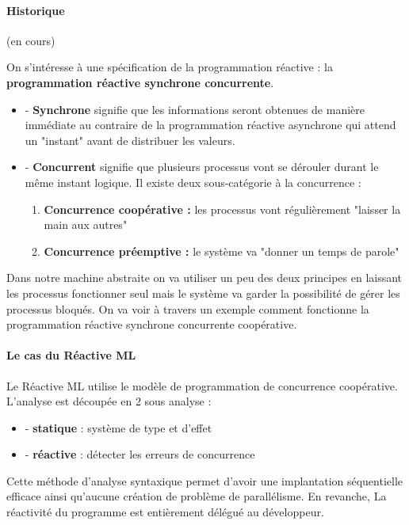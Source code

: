 \documentclass[10pt,a4paper]{report}
\begin{document}
\paragraph{Historique} (en cours)
\medbreak

On s'intéresse à une spécification de la programmation réactive : la \textbf{programmation réactive synchrone concurrente}.
\begin{itemize}
\item[] - \textbf{Synchrone} signifie que les informations seront obtenues de manière immédiate au contraire de la programmation réactive asynchrone qui attend un "instant" avant de distribuer les valeurs. 
\item[] - \textbf{Concurrent} signifie que plusieurs processus vont se dérouler durant le même instant logique. Il existe deux sous-catégorie à la concurrence :
  \begin{enumerate}
  \item \textbf{Concurrence coopérative :} les processus vont régulièrement "laisser la main aux autres"
  \item \textbf{Concurrence préemptive :} le système va "donner un temps de parole"
  \end{enumerate}
\end{itemize}
\smallbreak
Dans notre machine abstraite on va utiliser un peu des deux principes en laissant les processus fonctionner seul mais le système va garder la possibilité de gérer les processus bloqués. On va voir à travers un exemple comment fonctionne la programmation réactive synchrone concurrente coopérative.

\paragraph{Le cas du Réactive ML}
Le Réactive ML utilise le modèle de programmation de concurrence coopérative. 
\smallbreak
L'analyse est découpée en 2 sous analyse :
\begin{itemize}
\item[] - \textbf{statique} : système de type et d'effet
\item[] - \textbf{réactive} : détecter les erreurs de concurrence
\end{itemize}
\medbreak

Cette méthode d'analyse syntaxique permet d'avoir une implantation séquentielle efficace ainsi qu'aucune création de problème de parallélisme. En revanche, La réactivité du programme est entièrement délégué au développeur.
\medbreak
\end{document}
